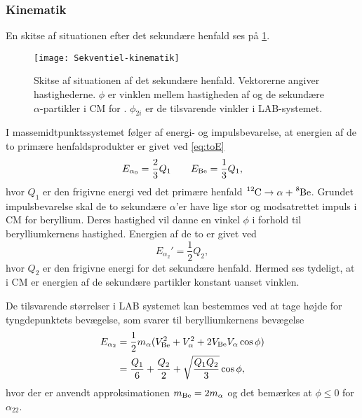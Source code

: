 \subsubsection{Kinematik}
\label{sec:sekv-kinematik}

En skitse af situationen efter det sekundære henfald ses på \cref{fig:secundary}.
\begin{figure}[h]
  \centering
  \texttt{[image: Sekventiel-kinematik]}
  \caption{Skitse af situationen af det sekundære henfald. Vektorerne angiver hastighederne. $\phi$ er
    vinklen mellem hastigheden af \Be og de sekundære $\alpha$-partikler i CM for \Be. $\phi_{2i}$ er
    de tilsvarende vinkler i LAB-systemet.}
  \label{fig:secundary}
\end{figure}

I massemidtpunktssystemet følger af energi- og impulsbevarelse, at energien af de to primære
henfaldsprodukter er givet ved \cref{eq:toE}
\begin{equation}
  \label{eq:Ealpha0}
  E_{\alpha_{0}} = \frac{2}{3} Q_{1} \qquad E_{\ce{Be}} = \frac{1}{3} Q_{1},
\end{equation}
hvor $Q_{1}$ er den frigivne energi ved det primære henfald $\Carb \rightarrow \alpha + \Be$. Grundet
impulsbevarelse skal de to sekundære $\alpha$'er have lige stor og modsatrettet impuls i CM for
beryllium. Deres hastighed vil danne en vinkel $\phi$ i forhold til berylliumkernens
hastighed. Energien af de to er givet ved
\begin{equation}
  \label{eq:Ealpha2}
  E_{\alpha_{2}}' = \frac{1}{2} Q_{2},
\end{equation}
hvor $Q_{2}$ er den frigivne energi for det sekundære henfald. Hermed ses tydeligt, at i CM er
energien af de sekundære partikler konstant uanset vinklen.

De tilsvarende størrelser i LAB systemet kan bestemmes ved at tage højde for tyngdepunktets
bevægelse, som svarer til berylliumkernens bevægelse
\begin{align}
  E_{\alpha_{2}} %
  &= \frac{1}{2}m_{\alpha} (V_{\ce{Be}}^{2} + V_{\alpha}^{2} + 2V_{\ce{Be}}V_{\alpha} \cos \phi) \notag \\
  &= \frac{Q_{1}}{6} + \frac{Q_{2}}{2} + \sqrt{\frac{Q_{1}Q_{2}}{3}} \cos \phi,           
  \label{eq:E2LAB} 
\end{align}
hvor der er anvendt approksimationen $m_{\ce{Be}} = 2m_{\alpha}$ og det bemærkes at $\phi \leq 0$ for $\alpha_{22}$. 

